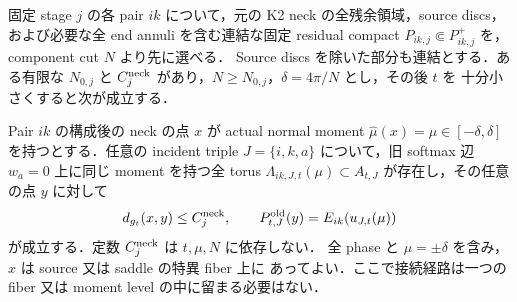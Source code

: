 \begin{lemma}
\label{ke:same-moment-corner-reference}
固定 stage $j$ の各 pair $ik$ について，元の K2 neck の全残余領域，source discs，
および必要な全 end annuli を含む連結な固定 residual compact
$P_{ik,j}\Subset P^+_{ik,j}$ を，component cut $N$ より先に選べる．
Source discs を除いた部分も連結とする．ある有限な $N_{0,j}$ と
$C_j^{\rm neck}$ があり，$N\ge N_{0,j}$，$\delta=4\pi/N$ とし，その後 $t$ を
十分小さくすると次が成立する．

Pair $ik$ の構成後の neck の点 $x$ が actual normal moment
$\widehat\mu(x)=\mu\in[-\delta,\delta]$ を持つとする．任意の incident triple
$J=\{i,k,a\}$ について，旧 softmax 辺 $w_a=0$ 上に同じ moment を持つ全 torus
$\Lambda_{ik,J,t}(\mu)\subset A_{t,J}$ が存在し，その任意の点 $y$ に対して
\begin{equation}\label{ke:eq:same-moment-corner-reference}
 d_{g_t}(x,y)\le C_j^{\rm neck},\qquad
 P^{\rm old}_{t,J}(y)=E_{ik}(u_{J,t}(\mu))
\end{equation}
が成立する．定数 $C_j^{\rm neck}$ は $t,\mu,N$ に依存しない．
全 phase と $\mu=\pm\delta$ を含み，$x$ は source 又は saddle の特異 fiber 上に
あってよい．ここで接続経路は一つの fiber 又は moment level の中に留まる必要はない．
\end{lemma}

